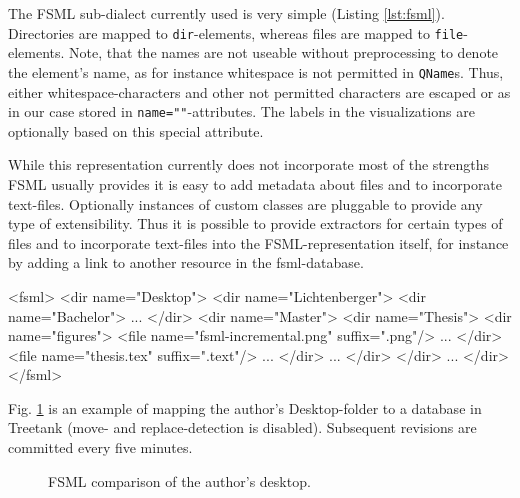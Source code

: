 The FSML sub-dialect currently used is very simple (Listing \ref{lst:fsml}). Directories are mapped to \texttt{dir}-elements, whereas files are mapped to \texttt{file}-elements. Note, that the names are not useable without preprocessing to denote the element's name, as for instance whitespace is not permitted in \texttt{QName}s. Thus, either whitespace-characters and other not permitted characters are escaped or as in our case stored in \texttt{name=""}-attributes. The labels in the visualizations are optionally based on this special attribute.

While this representation currently does not incorporate most of the strengths FSML usually provides it is easy to add metadata about files and to incorporate text-files. Optionally instances of custom classes are pluggable to provide any type of extensibility. Thus it is possible to provide extractors for certain types of files and to incorporate text-files into the FSML-representation itself, for instance by adding a link to another resource in the fsml-database.

\begin{code}[caption={FSML structure.},label={lst:fsml}]
<fsml>
  <dir name="Desktop">
    <dir name="Lichtenberger">
      <dir name="Bachelor">
        ...
      </dir>
      <dir name="Master">
        <dir name="Thesis">
          <dir name="figures">
            <file name="fsml-incremental.png" suffix=".png"/>
            ...
          </dir>
          <file name="thesis.tex" suffix=".text"/>
          ...
        </dir>
        ...
      </dir>
    </dir>
    ...
  </dir>
</fsml>
\end{code}

Fig. \ref{fig:fsml-item-size-pruning} is an example of mapping the author's Desktop-folder to a database in Treetank (move- and replace-detection is disabled). Subsequent revisions are committed every five minutes.

\begin{figure}[tb]
\caption{\label{fig:fsml-item-size-pruning} FSML comparison of the author's desktop.}
\end{figure}

